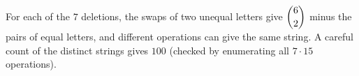 For each of the $7$ deletions, the swaps of two unequal letters give $\dbinom62$ minus the pairs of equal letters, and different operations can give the same string. A careful count of the distinct strings gives $\boxed{100}$ (checked by enumerating all $7\cdot15$ operations).
